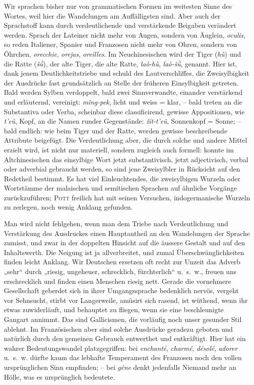{Wir sprachen bisher nur von grammatischen Formen im weitesten Sinne des Wortes, weil hier die Wandelungen am Auffälligsten sind. Aber auch der Sprachstoff kann durch verdeutlichende und verstärkende Beigaben verändert werden. Sprach der Lateiner nicht mehr von Augen, sondern von Äuglein, \textit{oculis}, so reden Italiener, Spanier und Franzosen \label{fp.240} nicht mehr von Ohren, sondern von Öhrchen, \textit{orecchie}, \textit{orejas}, \textit{oreilles}. Im Neuchinesischen wird der Tiger (\textit{hù}) und die Ratte (\textit{šǜ}), der alte Tiger, die alte Ratte, \textit{laò-hù}, \textit{laò-šǜ}, genannt. Hier ist, dank jenem Deutlichkeitstriebe und schuld des Lautverschliffes, die Zweisylbigkeit der Ausdrücke fast grundsätzlich an Stelle der früheren Einsylbigkeit getreten. Bald werden Sylben verdoppelt, bald zwei Sinnverwandte, einander verstärkend und erläuternd, vereinigt: \textit{mîng-pek}, licht und weiss = klar, – bald treten an die Substantiva oder Verba, scheinbar diese classificirend, gewisse Appositionen, wie \textit{t’eû}, Kopf, an die Namen runder Gegenstände: \textit{žit-t’eû}, Sonnenkopf = Sonne; – bald endlich: wie beim Tiger und der Ratte, werden gewisse beschreibende Attribute beigefügt. Die Verdeutlichung aber, die durch solche und andere Mittel erzielt wird, ist nicht nur materiell, sondern zugleich auch formell: konnte im Altchinesischen das einsylbige Wort jetzt substantivisch, jetzt adjectivisch, verbal oder adverbial gebraucht werden, so sind jene Zweisylbler in Rücksicht auf den Redetheil bestimmt. Es hat viel Einleuchtendes, die zweisylbigen Wurzeln oder Wortstämme der malaischen und semitischen Sprachen auf ähnliche Vorgänge zurückzuführen; \textsc{Pott} freilich hat mit seinen Versuchen, indogermanische Wurzeln zu zerlegen, noch wenig Anklang gefunden.

Man wird nicht fehlgehen, wenn man dem Triebe nach Verdeutlichung und Verstärkung des Ausdruckes einen Hauptantheil an den Wandelungen der Sprache zumisst, und zwar in der doppelten Hinsicht auf die äussere Gestalt und auf den \label{sp.243} Inhaltswerth. Die Neigung ist ja allverbreitet, und zumal Überschwänglichkeiten finden leicht Anklang. Wir Deutschen ersetzen oft recht zur Unzeit das Adverb „sehr“ durch „riesig, ungeheuer, schrecklich, fürchterlich“ u.~s.~w., freuen uns erschrecklich und finden einen Menschen riesig nett. Gerade die vornehmere Gesellschaft geberdet sich in ihrer Umgangssprache bedenklich nervös, vergeht vor Sehnsucht, stirbt vor Langerweile, amüsirt sich rasend, ist wüthend, wenn ihr etwas zuwiderläuft, und behauptet zu fliegen, wenn sie eine beschleunigte Gangart annimmt. Das sind Gallicismen, die vorläufig noch unser gesunder Stil ablehnt. Im Französischen aber sind solche Ausdrücke geradezu geboten und natürlich durch den gemeinen Gebrauch entwerthet und entkräftigt. Hier hat ein wahrer Bedeutungswandel platzgegriffen: bei \textit{enchanté}, \textit{charmé}, \textit{désolé}, \textit{adorer} u.~s.~w. dürfte kaum das lebhafte Temperament des Franzosen noch den vollen ursprüng\-\label{fp.241}lichen Sinn empfinden; – bei \textit{gêne} denkt jedenfalls Niemand mehr an Hölle, was es ursprünglich bedeutete.

}
